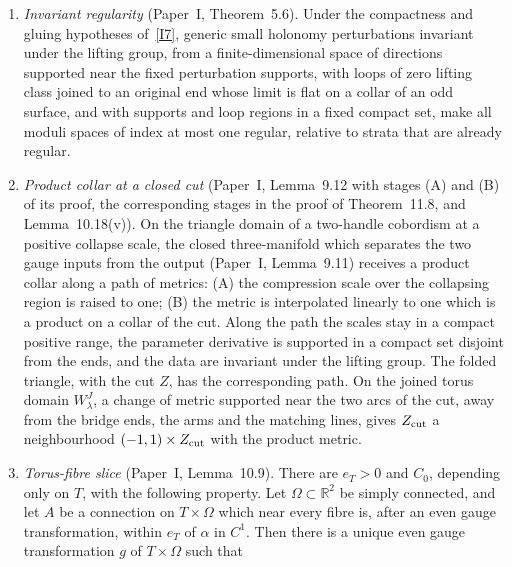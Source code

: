 \documentclass[11pt]{amsart}
\theoremstyle{definition}
\theoremstyle{remark}
\theoremstyle{plain}
\numberwithin{equation}{section}
\newcommand{\RR}{\mathbb R}
\begin{document}
\begin{enumerate}[label=(I\arabic*),ref=(I\arabic*)]
families statement in~\ref{I7} hold for families whose variation is translation invariant on the
mixed ends rather than compactly supported, provided the critical set on each mixed end is
connected and, with a family of stationary references solving the equation, independent of the
parameter, the variation vanishes on the gauge and ordinary ends, and the stationary operators keep
a uniform gap and an energy decay at a rate larger than the weight.
\item\label{I10} \emph{Invariant regularity} (Paper~I, Theorem~5.6). Under the compactness and
gluing hypotheses of~\ref{I7}, generic small holonomy perturbations invariant under the lifting
group, from a finite-dimensional space of directions supported near the fixed perturbation
supports, with loops of zero lifting class joined to an original end whose limit is flat on a collar
of an odd surface, and with supports and loop regions in a fixed compact set, make all moduli spaces
of index at most one regular, relative to strata that are already regular.
\item\label{I11} \emph{Product collar at a closed cut} (Paper~I, Lemma~9.12 with stages (A) and (B)
of its proof, the corresponding stages in the proof of Theorem~11.8, and Lemma~10.18(v)). On the
triangle domain of a two-handle cobordism at a positive collapse scale, the closed three-manifold
which separates the two gauge inputs from the output (Paper~I, Lemma~9.11) receives a product
collar along a path of metrics: (A) the compression scale over the collapsing region is raised to
one; (B) the metric is interpolated linearly to one which is a product on a collar of the cut.
Along the path the scales stay in a compact positive range, the parameter derivative is supported
in a compact set disjoint from the ends, and the data are invariant under the lifting group. The
folded triangle, with the cut $Z$, has the corresponding path. On the joined torus domain
$W^J_\lambda$, a change of metric supported near the two arcs of the cut, away from the bridge
ends, the arms and the matching lines, gives $Z_{\rm cut}$ a neighbourhood
$(-1,1)\times Z_{\rm cut}$ with the product metric.
\item\label{I12} \emph{Torus-fibre slice} (Paper~I, Lemma~10.9). There are $e_T>0$ and $C_0$,
depending only on $T$, with the following property. Let $\Omega\subset\RR^2$ be simply connected,
and let $A$ be a connection on $T\times\Omega$ which near every fibre is, after an even gauge
transformation, within $e_T$ of $\alpha$ in $C^1$. Then there is a unique even gauge
transformation $g$ of $T\times\Omega$ such that

\end{enumerate}
\end{document}
